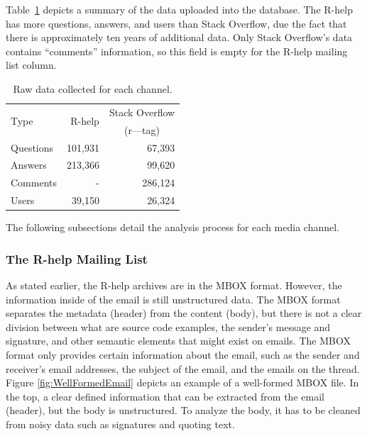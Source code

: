 \documentclass{sig-alternate-05-2015}
\begin{document}
	Table~\ref{table:data} depicts a summary of the data uploaded into the database. 
	The R-help has more questions, answers, and users than Stack Overflow, due the fact that there is approximately ten years of additional data.
	Only Stack Overflow's data contains ``comments'' information, so this field is empty for the R-help mailing list column.

	\begin{table}[!htb]
		\caption{Raw data collected for each channel.}
		\begin{center}
			\begin{tabular}{lrr}
				\toprule
				\multirow{2}{*}{Type} & \multirow{2}{*}{R-help} & Stack Overflow \\
				                      &                         & \multicolumn{1}{c}{(r---tag)}\\
				\midrule
				Questions     & 101,931 &  67,393 \\
				Answers       & 213,366 &  99,620 \\
				Comments      &       - & 286,124 \\
				Users         &  39,150 &  26,324 \\
				\bottomrule
			\end{tabular} 
		\end{center}
		\label{table:data}
	\end{table}

	The following subsections detail the analysis process for each media channel.

\subsubsection*{The R-help Mailing List}
\label{subsec:r-help}

	As stated earlier, the R-help archives are in the MBOX format. 
	However, the information inside of the email is still unstructured data.
	The MBOX format separates the metadata (header) from the content (body), but there is not a clear division between what are source code examples, the sender's message and signature, and other semantic elements that might exist on emails.
	The MBOX format only provides certain information about the email, such as the sender and receiver's email addresses, the subject of the email, and the emails on the thread.
	Figure \ref{fig:WellFormedEmail} depicts an example of a well-formed MBOX file.
	In the top, a clear defined information that can be extracted from the email (header), but the body is unstructured. To analyze the body, it has to be cleaned from noisy data such as signatures and quoting text.
\end{document}
